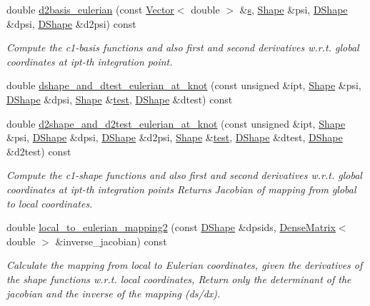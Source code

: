 \begin{DoxyCompactItemize}
double \hyperlink{classoomph_1_1BellElementBase_af6a719134aecd142c6a9667607993171}{d2basis\+\_\+eulerian} (const \hyperlink{classoomph_1_1Vector}{Vector}$<$ double $>$ \&\hyperlink{cfortran_8h_ab7123126e4885ef647dd9c6e3807a21c}{s}, \hyperlink{classoomph_1_1Shape}{Shape} \&psi, \hyperlink{classoomph_1_1DShape}{D\+Shape} \&dpsi, \hyperlink{classoomph_1_1DShape}{D\+Shape} \&d2psi) const
\begin{DoxyCompactList}\small\item\em Compute the c1-\/basis functions and also first and second derivatives w.\+r.\+t. global coordinates at ipt-\/th integration point. \end{DoxyCompactList}\item 
double \hyperlink{classoomph_1_1BellElementBase_ade54f5038bd917ff2a4c636e066db00e}{dshape\+\_\+and\+\_\+dtest\+\_\+eulerian\+\_\+at\+\_\+knot} (const unsigned \&ipt, \hyperlink{classoomph_1_1Shape}{Shape} \&psi, \hyperlink{classoomph_1_1DShape}{D\+Shape} \&dpsi, \hyperlink{classoomph_1_1Shape}{Shape} \&\hyperlink{classoomph_1_1BellElementBase_a76ddb90394c979f9967e8fd068bdf220}{test}, \hyperlink{classoomph_1_1DShape}{D\+Shape} \&dtest) const
\item 
double \hyperlink{classoomph_1_1BellElementBase_a8bf466c908c0c3cf661229429961d5d0}{d2shape\+\_\+and\+\_\+d2test\+\_\+eulerian\+\_\+at\+\_\+knot} (const unsigned \&ipt, \hyperlink{classoomph_1_1Shape}{Shape} \&psi, \hyperlink{classoomph_1_1DShape}{D\+Shape} \&dpsi, \hyperlink{classoomph_1_1DShape}{D\+Shape} \&d2psi, \hyperlink{classoomph_1_1Shape}{Shape} \&\hyperlink{classoomph_1_1BellElementBase_a76ddb90394c979f9967e8fd068bdf220}{test}, \hyperlink{classoomph_1_1DShape}{D\+Shape} \&dtest, \hyperlink{classoomph_1_1DShape}{D\+Shape} \&d2test) const
\begin{DoxyCompactList}\small\item\em Compute the c1-\/shape functions and also first and second derivatives w.\+r.\+t. global coordinates at ipt-\/th integration points Returns Jacobian of mapping from global to local coordinates. \end{DoxyCompactList}\item 
double \hyperlink{classoomph_1_1BellElementBase_a17c3c26035cb8f8696073b97dabbe392}{local\+\_\+to\+\_\+eulerian\+\_\+mapping2} (const \hyperlink{classoomph_1_1DShape}{D\+Shape} \&dpsids, \hyperlink{classoomph_1_1DenseMatrix}{Dense\+Matrix}$<$ double $>$ \&inverse\+\_\+jacobian) const
\begin{DoxyCompactList}\small\item\em Calculate the mapping from local to Eulerian coordinates, given the derivatives of the shape functions w.\+r.\+t. local coordinates, Return only the determinant of the jacobian and the inverse of the mapping (ds/dx). \end{DoxyCompactList}\item 

\end{DoxyCompactItemize}
